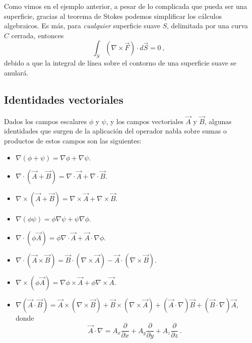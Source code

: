 Como vimos en el ejemplo anterior, a pesar de lo complicada que pueda ser una superficie, gracias al teorema de Stokes podemos simplificar los cálculos algebraicos. Es más, para \emph{cualquier} superficie suave $S$, delimitada por una curva $C$ cerrada, entonces 
\begin{equation*}
    \int_S (\nabla \times \vec{F}) \cdot d\vec{S} = 0 \ ,
\end{equation*}
debido a que la integral de línea sobre el contorno de una superficie suave se anulará.

\subsection{Identidades vectoriales}

Dados los campos escalares $\phi$ y $\psi$, y los campos vectoriales $\vec{A}$ y $\vec{B}$, algunas identidades que surgen de la aplicación del operador nabla sobre sumas o productos de estos campos son las siguientes:
\begin{itemize}
    \item $\nabla (\phi + \psi) = \nabla \phi + \nabla \psi$.
    \item $\nabla \cdot \left( \vec{A} + \vec{B} \right) = \nabla \cdot \vec{A} + \nabla \cdot \vec{B}$.
    \item $\nabla \times \left( \vec{A} + \vec{B} \right) = \nabla \times \vec{A} + \nabla \times \vec{B}$.
    \item $\nabla(\phi \psi) = \phi \nabla \psi + \psi \nabla \phi$.
    \item $\nabla \cdot \left( \phi \vec{A} \right) = \phi \nabla \cdot \vec{A} + \vec{A} \cdot \nabla \phi$.
    \item $\nabla \cdot (\vec{A} \times \vec{B}) = \vec{B} \cdot (\nabla \times \vec{A}) - \vec{A} \cdot (\nabla \times \vec{B})$.
    \item $\nabla \times (\phi \vec{A}) = \nabla \phi \times \vec{A} + \phi \nabla \times \vec{A}$.
    \item $\nabla(\vec{A} \cdot \vec{B}) = \vec{A} \times (\nabla \times \vec{B}) + \vec{B} \times (\nabla \times \vec{A}) + (\vec{A} \cdot \nabla) \vec{B} + (\vec{B} \cdot \nabla) \vec{A}$,
    donde 
    \begin{equation*}
        \vec{A} \cdot \nabla = A_x \frac{\partial}{\partial x} + A_y \frac{\partial}{\partial y} + A_z \frac{\partial}{\partial z} \ .
    \end{equation*}
\end{itemize}


